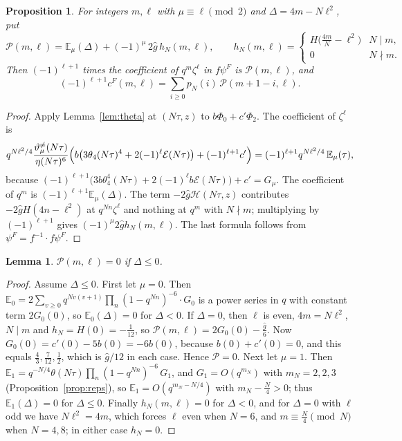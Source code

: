 \documentclass[11pt]{amsart}
\newtheorem{proposition}[theorem]{Proposition}
\newtheorem{lemma}[theorem]{Lemma}
\theoremstyle{definition}
\newcommand{\cF}{c^{F}}
\newcommand{\Hc}{\mathcal{H}}
\newcommand{\Ei}{\mathcal{E}}
\newcommand{\gh}{\hat g}
\newcommand{\vtn}{\vartheta^{\neq}}
\begin{document}
\begin{proposition}\label{prop:coeff}
For integers $m,\ell$ with $\mu\equiv\ell\pmod2$ and $\Delta=4m-N\ell^2$, put
\[
\mathcal P(m,\ell)=\mathbb E_\mu(\Delta)+(-1)^\mu\,2\gh\,h_N(m,\ell),\qquad h_N(m,\ell)=\begin{cases}H\bigl(\tfrac{4m}N-\ell^2\bigr)&N\mid m,\\0&N\nmid m.\end{cases}
\]
Then $(-1)^{\ell+1}$ times the coefficient of $q^m\zeta^\ell$ in $f\psi^F$ is $\mathcal P(m,\ell)$, and
\[
(-1)^{\ell+1}\cF(m,\ell)=\sum_{i\ge0}p_N(i)\,\mathcal P(m+1-i,\ell).
\]
\end{proposition}

\begin{proof}
Apply Lemma~\ref{lem:theta} at $(N\tau,z)$ to $b\Phi_0+c'\Phi_2$. The coefficient of $\zeta^\ell$ is
\[
q^{N\ell^2/4}\frac{\vtn_\mu(N\tau)}{\eta(N\tau)^6}\Bigl(b\bigl(3\theta_4(N\tau)^4+2(-1)^\ell\Ei(N\tau)\bigr)+(-1)^{\ell+1}c'\Bigr)=(-1)^{\ell+1}q^{N\ell^2/4}\,\mathbb E_\mu(\tau),
\]
because $(-1)^{\ell+1}\bigl(3b\theta_4^4(N\tau)+2(-1)^\ell b\Ei(N\tau)\bigr)+c'=G_\mu$. The coefficient of $q^m$ is $(-1)^{\ell+1}\mathbb E_\mu(\Delta)$. The term $-2\gh\Hc(N\tau,z)$ contributes $-2\gh H(4n-\ell^2)$ at $q^{Nn}\zeta^\ell$ and nothing at $q^m$ with $N\nmid m$; multiplying by $(-1)^{\ell+1}$ gives $(-1)^\mu2\gh h_N(m,\ell)$. The last formula follows from $\psi^F=f^{-1}\cdot f\psi^F$.
\end{proof}

\begin{lemma}\label{lem:small}
$\mathcal P(m,\ell)=0$ if $\Delta\le0$.
\end{lemma}

\begin{proof}
Assume $\Delta\le 0$. First let $\mu=0$. Then $\mathbb E_0=2\sum_{v\ge0}q^{Nv(v+1)}\prod_n(1-q^{Nn})^{-6}\cdot G_0$ is a power series in $q$ with constant term $2G_0(0)$, so $\mathbb E_0(\Delta)=0$ for $\Delta<0$. If $\Delta=0$, then $\ell$ is even, $4m=N\ell^2$, $N\mid m$ and $h_N=H(0)=-\frac1{12}$, so $\mathcal P(m,\ell)=2G_0(0)-\frac{\gh}6$. Now $G_0(0)=c'(0)-5b(0)=-6b(0)$, because $b(0)+c'(0)=0$, and this equals $\frac43,\frac7{12},\frac12$, which is $\gh/12$ in each case. Hence $\mathcal P=0$. Next let $\mu=1$. Then $\mathbb E_1=q^{-N/4}\theta(N\tau)\prod_n(1-q^{Nn})^{-6}\,G_1$, and $G_1=O(q^{m_N})$ with $m_N=2,2,3$ (Proposition~\ref{prop:reps}), so $\mathbb E_1=O(q^{m_N-N/4})$ with $m_N-\frac N4>0$; thus $\mathbb E_1(\Delta)=0$ for $\Delta\le0$. Finally $h_N(m,\ell)=0$ for $\Delta<0$, and for $\Delta=0$ with $\ell$ odd we have $N\ell^2=4m$, which forces $\ell$ even when $N=6$, and $m\equiv\frac N4\pmod N$ when $N=4,8$; in either case $h_N=0$.
\end{proof}
\end{document}
